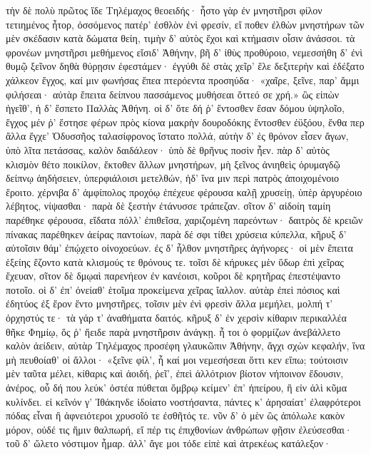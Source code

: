 τὴν δὲ πολὺ πρῶτος ἴδε Τηλέμαχος θεοειδής·
ἧστο γὰρ ἐν μνηστῆρσι φίλον τετιημένος ἦτορ,
ὀσσόμενος πατέρ' ἐσθλὸν ἐνὶ φρεσίν, εἴ ποθεν ἐλθὼν
μνηστήρων τῶν μὲν σκέδασιν κατὰ δώματα θείη,
τιμὴν δ' αὐτὸς ἔχοι καὶ κτήμασιν οἷσιν ἀνάσσοι.
τὰ φρονέων μνηστῆρσι μεθήμενος εἴσιδ' Ἀθήνην,
βῆ δ' ἰθὺς προθύροιο, νεμεσσήθη δ' ἐνὶ θυμῷ
ξεῖνον δηθὰ θύρῃσιν ἐφεστάμεν· ἐγγύθι δὲ στὰς    
χεῖρ' ἕλε δεξιτερὴν καὶ ἐδέξατο χάλκεον ἔγχος,
καί μιν φωνήσας ἔπεα πτερόεντα προσηύδα·
\nstanza
«χαῖρε, ξεῖνε, παρ' ἄμμι φιλήσεαι· αὐτὰρ ἔπειτα
δείπνου πασσάμενος μυθήσεαι ὅττεό σε χρή.»
\nstanza
ὣς εἰπὼν ἡγεῖθ', ἡ δ' ἕσπετο Παλλὰς Ἀθήνη.
οἱ δ' ὅτε δή ῥ' ἔντοσθεν ἔσαν δόμου ὑψηλοῖο,
ἔγχος μέν ῥ' ἔστησε φέρων πρὸς κίονα μακρὴν
δουροδόκης ἔντοσθεν ἐϋξόου, ἔνθα περ ἄλλα
ἔγχε' Ὀδυσσῆος ταλασίφρονος ἵστατο πολλά,
αὐτὴν δ' ἐς θρόνον εἷσεν ἄγων, ὑπὸ λῖτα πετάσσας,    
καλὸν δαιδάλεον· ὑπὸ δὲ θρῆνυς ποσὶν ἦεν.
πὰρ δ' αὐτὸς κλισμὸν θέτο ποικίλον, ἔκτοθεν ἄλλων
μνηστήρων, μὴ ξεῖνος ἀνιηθεὶς ὀρυμαγδῷ
δείπνῳ ἀηδήσειεν, ὑπερφιάλοισι μετελθών,
ἠδ' ἵνα μιν περὶ πατρὸς ἀποιχομένοιο ἔροιτο.
χέρνιβα δ' ἀμφίπολος προχόῳ ἐπέχευε φέρουσα
καλῇ χρυσείῃ, ὑπὲρ ἀργυρέοιο λέβητος,
νίψασθαι· παρὰ δὲ ξεστὴν ἐτάνυσσε τράπεζαν.
σῖτον δ' αἰδοίη ταμίη παρέθηκε φέρουσα,
εἴδατα πόλλ' ἐπιθεῖσα, χαριζομένη παρεόντων·    
δαιτρὸς δὲ κρειῶν πίνακας παρέθηκεν ἀείρας
παντοίων, παρὰ δέ σφι τίθει χρύσεια κύπελλα,
κῆρυξ δ' αὐτοῖσιν θάμ' ἐπῴχετο οἰνοχοεύων.
\nstanza
ἐς δ' ἦλθον μνηστῆρες ἀγήνορες· οἱ μὲν ἔπειτα
ἑξείης ἕζοντο κατὰ κλισμούς τε θρόνους τε.
τοῖσι δὲ κήρυκες μὲν ὕδωρ ἐπὶ χεῖρας ἔχευαν,
σῖτον δὲ δμῳαὶ παρενήεον ἐν κανέοισι,
κοῦροι δὲ κρητῆρας ἐπεστέψαντο ποτοῖο.
οἱ δ' ἐπ' ὀνείαθ' ἑτοῖμα προκείμενα χεῖρας ἴαλλον.
αὐτὰρ ἐπεὶ πόσιος καὶ ἐδητύος ἐξ ἔρον ἕντο    
μνηστῆρες, τοῖσιν μὲν ἐνὶ φρεσὶν ἄλλα μεμήλει,
μολπή τ' ὀρχηστύς τε· τὰ γάρ τ' ἀναθήματα δαιτός.
κῆρυξ δ' ἐν χερσὶν κίθαριν περικαλλέα θῆκε
Φημίῳ, ὅς ῥ' ἤειδε παρὰ μνηστῆρσιν ἀνάγκῃ.
ἦ τοι ὁ φορμίζων ἀνεβάλλετο καλὸν ἀείδειν,
αὐτὰρ Τηλέμαχος προσέφη γλαυκῶπιν Ἀθήνην,
ἄγχι σχὼν κεφαλήν, ἵνα μὴ πευθοίαθ' οἱ ἄλλοι·
\nstanza
«ξεῖνε φίλ', ἦ καί μοι νεμεσήσεαι ὅττι κεν εἴπω;
τούτοισιν μὲν ταῦτα μέλει, κίθαρις καὶ ἀοιδή,
ῥεῖ', ἐπεὶ ἀλλότριον βίοτον νήποινον ἔδουσιν,    
ἀνέρος, οὗ δή που λεύκ' ὀστέα πύθεται ὄμβρῳ
κείμεν' ἐπ' ἠπείρου, ἢ εἰν ἁλὶ κῦμα κυλίνδει.
εἰ κεῖνόν γ' Ἰθάκηνδε ἰδοίατο νοστήσαντα,
πάντες κ' ἀρησαίατ' ἐλαφρότεροι πόδας εἶναι
ἢ ἀφνειότεροι χρυσοῖό τε ἐσθῆτός τε.
νῦν δ' ὁ μὲν ὣς ἀπόλωλε κακὸν μόρον, οὐδέ τις ἥμιν
θαλπωρή, εἴ πέρ τις ἐπιχθονίων ἀνθρώπων
φῇσιν ἐλεύσεσθαι· τοῦ δ' ὤλετο νόστιμον ἦμαρ.
ἀλλ' ἄγε μοι τόδε εἰπὲ καὶ ἀτρεκέως κατάλεξον·
